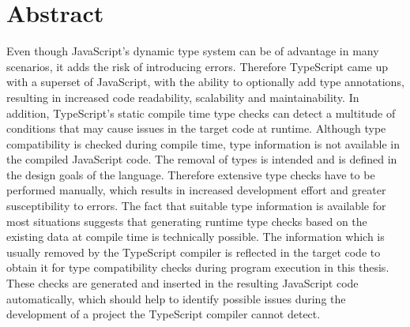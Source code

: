 \chapter{Abstract}


Even though JavaScript's dynamic type system can be of advantage in many scenarios, it adds the risk of introducing errors. Therefore TypeScript came up with a superset of JavaScript, with the ability to optionally add type annotations, resulting in increased code readability, scalability and maintainability. In addition, TypeScript's static compile time type checks can detect a multitude of conditions that may cause issues in the target code at runtime. Although type compatibility is checked during compile time, type information is not available in the compiled JavaScript code. The removal of types is intended and is defined in the design goals of the language. Therefore extensive type checks have to be performed manually, which results in increased development effort and greater susceptibility to errors. The fact that suitable type information is available for most situations suggests that generating runtime type checks based on the existing data at compile time is technically possible. The information which is usually removed by the TypeScript compiler is reflected in the target code to obtain it for type compatibility checks during program execution in this thesis. These checks are generated and inserted in the resulting JavaScript code automatically, which should help to identify possible issues during the development of a project the TypeScript compiler cannot detect.